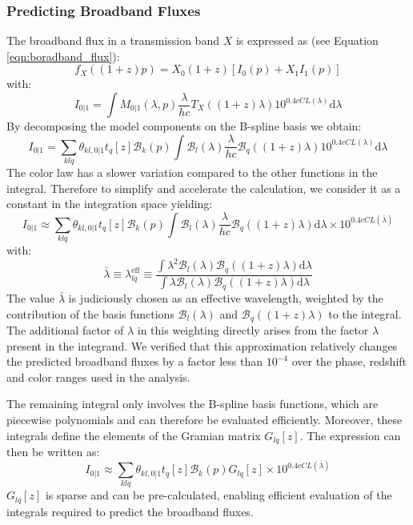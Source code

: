 \subsubsection{Predicting Broadband Fluxes}

The broadband flux in a transmission band $X$ is expressed as (see Equation \ref{eqn:boradband_flux}):
\begin{equation}
    f_X((1+z)p) = X_0 (1+z) [I_0(p) + X_1I_1(p)]
\end{equation}
with:
\begin{equation}
    I_{0|1} = \int M_{0|1}(\lambda, p) \frac{\lambda}{hc}T_X((1+z)\lambda) 10^{0.4cCL(\lambda)} \text{d}\lambda
\end{equation}
By decomposing the model components on the B-spline basis we obtain:
\begin{equation}
    I_{0|1} = \sum_{klq} \theta_{kl,0|1} t_q[z] \mathcal{B}_k(p) \int \mathcal{B}_l(\lambda) \frac{\lambda}{hc} \mathcal{B}_q((1+z)\lambda) 10^{0.4cCL(\lambda)} \text{d}\lambda
\end{equation}
The color law has a slower variation compared to the other functions in the integral. Therefore to simplify and accelerate the calculation, we consider it as a constant in the 
integration space yielding:
\begin{equation}
    I_{0|1} \approx \sum_{klq} \theta_{kl,0|1} t_q[z] \mathcal{B}_k(p) \int \mathcal{B}_l(\lambda) \frac{\lambda}{hc} \mathcal{B}_q((1+z)\lambda)\text{d}\lambda \times 10^{0.4cCL(\bar{\lambda})} 
\end{equation}
with:
\begin{equation}
    \bar{\lambda} \equiv \lambda_{lq}^{\text{eff}} \equiv \frac{
        \int \lambda^2 \mathcal{B}_l(\lambda) \mathcal{B}_q((1+z)\lambda) \text{d}\lambda
    }{
        \int \lambda \mathcal{B}_l(\lambda) \mathcal{B}_q((1+z)\lambda) \text{d}\lambda
    }
\end{equation}
The value $\bar{\lambda}$ is judiciously chosen as an effective wavelength, 
weighted by the contribution of the basis functions 
$\mathcal{B}_l(\lambda)$ and $\mathcal{B}_q((1+z)\lambda)$ to the integral. 
The additional factor of $\lambda$ in this weighting directly arises 
from the factor $\lambda$ present in the integrand. 
We verified that this approximation relatively changes the predicted broadband 
fluxes by a factor less than $10^{-4}$ over the phase, redshift and color 
ranges used in the analysis. 

The remaining integral only involves the B-spline basis functions, which are piecewise polynomials and can therefore be evaluated efficiently. 
Moreover, these integrals define the elements of the Gramian matrix $G_{lq}[z]$. The expression can then be written as:
\begin{equation}
    I_{0|1} \approx \sum_{klq} \theta_{kl,0|1} t_q[z] \mathcal{B}_k(p) G_{lq}[z] \times 10^{0.4cCL(\bar{\lambda})} 
\end{equation}
$G_{lq}[z]$ is sparse and can be pre-calculated, enabling efficient evaluation of the integrals required to predict the broadband fluxes. 

